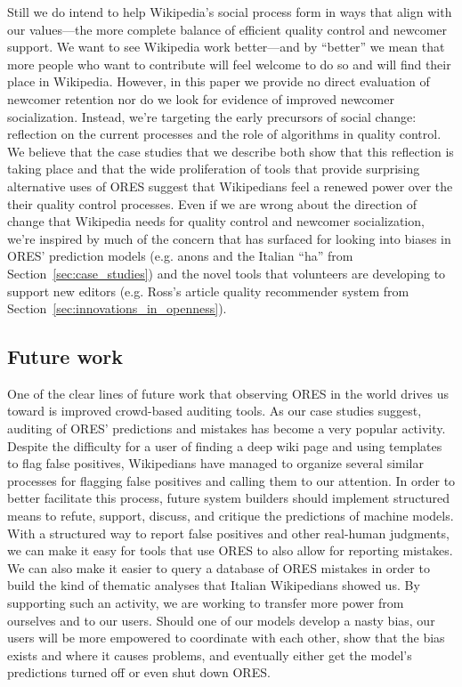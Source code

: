 Still we do intend to help Wikipedia's social process form in ways that align with our values---the more complete balance of efficient quality control and newcomer support.  We want to see Wikipedia work better---and by ``better'' we mean that more people who want to contribute will feel welcome to do so and will find their place in Wikipedia.  However, in this paper we provide no direct evaluation of newcomer retention nor do we look for evidence of improved newcomer socialization.  Instead, we're targeting the early precursors of social change: reflection on the current processes and the role of algorithms in quality control.  We believe that the case studies that we describe both show that this reflection is taking place and that the wide proliferation of tools that provide surprising alternative uses of ORES suggest that  Wikipedians feel a renewed power over the their quality control processes.  Even if we are wrong about the direction of change that Wikipedia needs for quality control and newcomer socialization, we're inspired by much of the concern that has surfaced for looking into biases in ORES' prediction models (e.g. anons and the Italian ``ha'' from Section~\ref{sec:case_studies}) and the novel tools that volunteers are developing to support new editors (e.g. Ross's article quality recommender system from Section~\ref{sec:innovations_in_openness}).

\subsection{Future work}
One of the clear lines of future work that observing ORES in the world drives us toward is improved crowd-based auditing tools.  As our case studies suggest, auditing of ORES' predictions and mistakes has become a very popular activity.  Despite the difficulty for a user of finding a deep wiki page and using templates to flag false positives, Wikipedians have managed to organize several similar processes for flagging false positives and calling them to our attention.  In order to better facilitate this process, future system builders should implement structured means to refute, support, discuss, and critique the predictions of machine models.  With a structured way to report false positives and other real-human judgments, we can make it easy for tools that use ORES to also allow for reporting mistakes.  We can also make it easier to query a database of ORES mistakes in order to build the kind of thematic analyses that Italian Wikipedians showed us.  By supporting such an activity, we are working to transfer more power from ourselves and to our users.  Should one of our models develop a nasty bias, our users will be more empowered to coordinate with each other, show that the bias exists and where it causes problems, and eventually either get the model's predictions turned off or even shut down ORES.

